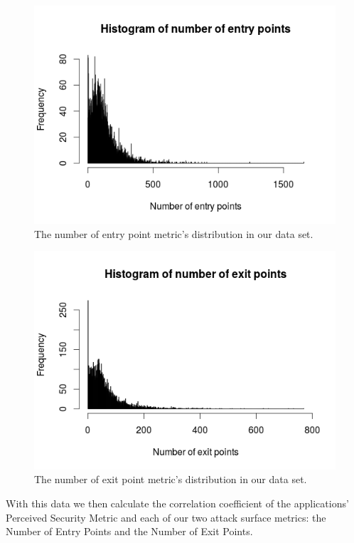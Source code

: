 \documentclass{sig-alternate}
\begin{document}
\begin{figure}
  \centering
  \includegraphics[scale=0.50]{figs/histogram_entry_points.png}
  \caption{The number of entry point metric's distribution in our data set.}
  \label{fig:entrypoints}
\end{figure}

\begin{figure}
  \centering
  \includegraphics[scale=0.50]{figs/histogram_exit_points.png}
  \caption{The number of exit point metric's distribution in our data set.}
  \label{fig:exitpoints}
\end{figure}

With this data we then calculate the correlation coefficient of the applications' Perceived Security Metric and each of our two attack surface metrics: the Number of Entry Points and the Number of Exit Points.
\end{document}
